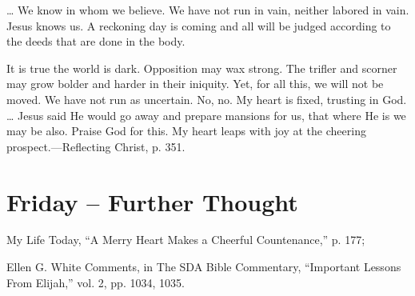\documentclass[a4paper, 10pt, twoside, headings=small]{scrartcl}
\begin{document}
\begin{multicols}{2}
… We know in whom we believe. We have not run in vain, neither labored in vain. Jesus knows us. A reckoning day is coming and all will be judged according to the deeds that are done in the body.

It is true the world is dark. Opposition may wax strong. The trifler and scorner may grow bolder and harder in their iniquity. Yet, for all this, we will not be moved. We have not run as uncertain. No, no. My heart is fixed, trusting in God. … Jesus said He would go away and prepare mansions for us, that where He is we may be also. Praise God for this. My heart leaps with joy at the cheering prospect.—Reflecting Christ, p. 351.

\section*{Friday – Further Thought}

\setlength{\parindent}{0pt}My Life Today, “A Merry Heart Makes a Cheerful Countenance,” p. 177;

Ellen G. White Comments, in The SDA Bible Commentary, “Important Lessons From Elijah,” vol. 2, pp. 1034, 1035.

\end{multicols}
\end{document}
